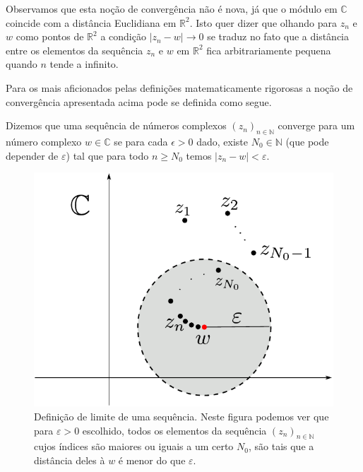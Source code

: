 Observamos que esta noção de convergência não é nova, já que o módulo em $\mathbb{C}$
coincide com a distância Euclidiana em $\mathbb{R}^2$. Isto quer dizer que olhando para 
$z_n$ e $w$ como pontos de $\mathbb{R}^2$ a condição $|z_n-w|\to 0$ se traduz no fato
que a distância entre os elementos da sequência $z_n$ e $w$ em $\mathbb{R}^2$ 
fica arbitrariamente pequena quando $n$ tende a infinito. 

Para os mais aficionados pelas definições matematicamente rigorosas a noção de convergência
apresentada acima pode se definida como segue.

\begin{definicao}\label{def-limite-seq}
Dizemos que uma sequência de números complexos $(z_n)_{n\in\mathbb{N}}$ converge para um número 
complexo $w\in \mathbb{C}$ se para cada $\epsilon>0$ dado, existe $N_0\in\mathbb{N}$ 
(que pode depender de $\varepsilon$) tal que para todo $n\geqslant N_0$ temos 
$|z_n-w|<\varepsilon$. 
\end{definicao}

\begin{figure}[h]
\centering
\includegraphics[scale=0.6]{Figuras/fig-sequencia-convergente}
\caption{Definição de limite de uma sequência. Neste figura podemos ver que para $\varepsilon>0$ escolhido, todos os elementos da sequência $(z_n)_{n\in\mathbb{N}}$ cujos índices são maiores ou iguais a um certo $N_0$, são tais que a distância deles à $w$ é menor do que $\varepsilon$.}
\label{fig-sequencia-cauchy1}
\end{figure}


